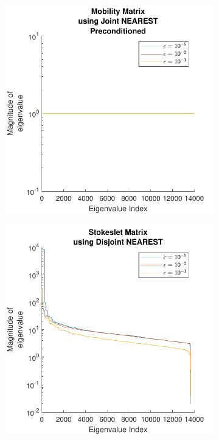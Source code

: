 \begin{figure}
\ContinuedFloat
    \begin{subfigure}{0.45\textwidth}
        \centering
        \includegraphics[width=\linewidth]{Images/Condition/Eigen-Mobility Matrix using Joint NEAREST Preconditioned.pdf}
    \end{subfigure}
    \hfill
    \begin{subfigure}{0.45\textwidth}
        \centering
        \includegraphics[width=\linewidth]{Images/Condition/Eigen-Stokeslet Matrix using Disjoint NEAREST.pdf}

\end{subfigure}
\end{figure}
